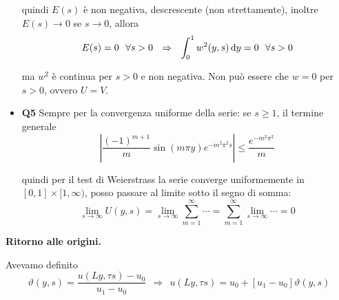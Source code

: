 \begin{itemize}
quindi $E(s)$ è non negativa, descrescente (non strettamente), inoltre $E(s)\rightarrow 0$ se $s\rightarrow 0$, allora
\begin{equation*}
    E(s) =0\ \ \forall s >0\ \ \Rightarrow \ \ \int ^{1}_{0} w^{2}(y,s) \dy=0\ \ \forall s >0
\end{equation*}

ma $w^{2}$ è continua per $s >0$ e non negativa. Non può essere che $w=0$ per $s >0$, ovvero $U=V$.
\item \textbf{Q5} Sempre per la convergenza uniforme della serie: se $\displaystyle s\geq 1$, il termine generale \begin{equation*}
    \left| \frac{(-1)^{m+1}}{m}\sin(m\pi y) e^{-m^{2} \pi ^{2} s}\right| \leq \frac{e^{-m^{2} \pi ^{2}}}{m}
\end{equation*}

quindi per il test di Weierstrass la serie converge uniformemente in $\displaystyle [ 0,1] \times [ 1,\infty)$, posso passare al limite sotto il segno di somma:
\begin{equation*}
    \lim_{s \to \infty} U(y,s) = \lim_{s \to \infty} \sum\limits ^{\infty }_{m=1}\cdots = \sum\limits ^{\infty }_{m=1} \lim_{s \to \infty} \cdots = 0
\end{equation*}
\end{itemize}

\textbf{Ritorno alle origini.}

Avevamo definito
\begin{equation*}
    \vartheta(y,s) =\frac{u(Ly,\tau s) -u_{0}}{u_{1} -u_{0}} \ \ \Rightarrow \ \ u(Ly,\tau s) =u_{0} +[ u_{1} -u_{0}] \vartheta(y,s)
\end{equation*}

